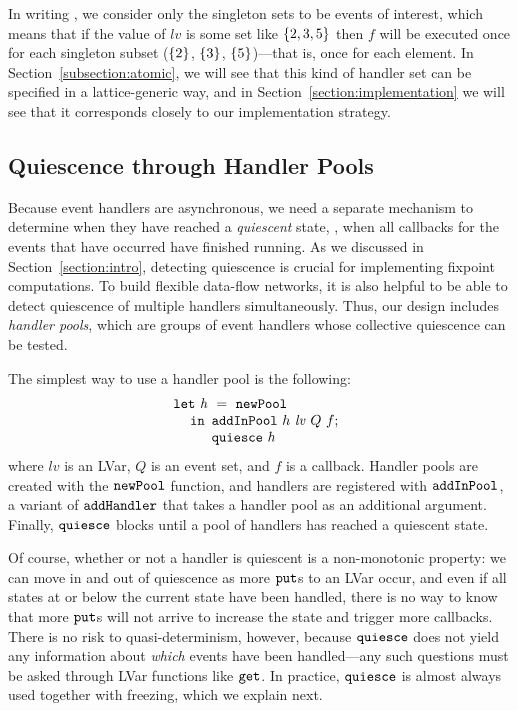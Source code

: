 In writing , we consider only the singleton sets to be events
of interest, which means that if the value of $\mathit{lv}$ is some set like
$\left\{2, 3, 5\right\}$ then $f$ will be executed once for each singleton subset
($\left\{2\right\}$, $\left\{3\right\}$, $\left\{5\right\}$)---that is, once for each element.  In
Section~\ref{subsection:atomic}, we will see that this kind of handler set can be specified in a
lattice-generic way, and in Section~\ref{section:implementation} we will see
that it corresponds closely to our implementation strategy.  


\subsection{Quiescence through Handler Pools}
\label{sec:quiescence-informal}

Because event handlers are asynchronous, we need a separate mechanism to
determine when they have reached a \emph{quiescent} state, \ie, when all
callbacks for the events that have occurred have finished running.  As we
discussed in Section~\ref{section:intro}, detecting quiescence is crucial for implementing
fixpoint computations.  To build flexible data-flow networks, it is also helpful
to be able to detect quiescence of multiple handlers simultaneously.  Thus, our
design includes \emph{handler pools}, which are groups of event handlers whose
collective quiescence can be tested.

The simplest way to use a handler pool is the following:
\[
\begin{array}[t]{l}
\mbox{\texttt{let}}~\mathit{h}~=~{\mbox{\texttt{newPool}}} \\
\hspace{1.2em} \mbox{\texttt{in}}
  \begin{array}[t]{l}
    {\mbox{\texttt{addInPool}}}~h~\mathit{lv}~Q~f; \\
    {\mbox{\texttt{quiesce}}}~h
  \end{array}
\end{array}
\]
where $\mathit{lv}$ is an LVar, $Q$ is an event set, and $f$ is a callback.
Handler pools are created with the ${\mbox{\texttt{newPool}}}$ function, and handlers are
registered with ${\mbox{\texttt{addInPool}}}$, a variant of ${\mbox{\texttt{addHandler}}}$ that takes a
handler pool as an additional argument.  Finally, ${\mbox{\texttt{quiesce}}}$ blocks until a pool
of handlers has reached a quiescent state.  

Of course, whether or not a handler is quiescent is a non-monotonic property: we
can move in and out of quiescence as more $\mbox{\texttt{put}}$s to an LVar occur, and even if
all states at or below the current state have been handled, there is no way to
know that more $\mbox{\texttt{put}}$s will not arrive to increase the state and trigger more
callbacks.  There is no risk to quasi-determinism, however, because ${\mbox{\texttt{quiesce}}}$
does not yield any information about \emph{which} events have been handled---any
such questions must be asked through LVar functions like $\mbox{\texttt{get}}$.  In
practice, ${\mbox{\texttt{quiesce}}}$ is almost always used together with freezing, which we
explain next.

